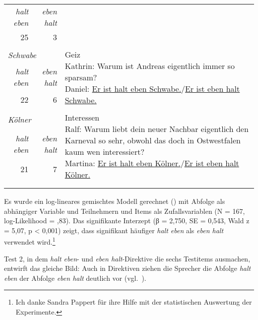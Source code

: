 \begin{table}
\begin{tabularx}{\textwidth}{rrX}
\cmidrule(lr){1-2}
\emph{halt eben}& \emph{eben halt} & {}\\
\cmidrule(lr){1-2}
25 & 3 & {}\\
 & & {}\\
\midrule
\multicolumn{2}{l}{{\textit{Schwabe}}}& \multirow{3}{\hsize}{{Geiz
}\newline Kathrin: Warum ist Andreas eigentlich immer so sparsam? \newline
Daniel: \ul{Er ist halt eben Schwabe.}/\ul{Er ist eben halt Schwabe.}}\\
\cmidrule(lr){1-2}
\emph{halt eben}& \emph{eben halt} & {}\\
\cmidrule(lr){1-2}
22 & 6 & {}\\
 & & {}\\
\midrule
\multicolumn{2}{l}{{\textit{Kölner}}}& \multirow{4}{\hsize}{{Interessen
}\newline Ralf: Warum liebt dein neuer Nachbar eigentlich den Karneval so 
sehr, obwohl das doch in Ostwestfalen kaum wen interessiert? \newline	
Martina: \ul{Er ist halt eben Kölner.}/\ul{Er ist eben halt Kölner.}}\\
\cmidrule(lr){1-2}
\emph{halt eben}& \emph{eben halt} & {}\\
\cmidrule(lr){1-2}
21 & 7 & {}\\
& & \\
 & & {}\\
\lspbottomrule
\end{tabularx}
\end{table}
Es wurde ein log-lineares gemischtes Modell gerechnet (\citealt{Baayen2008}) mit Abfolge als abhängiger Variable und Teilnehmern und Items als Zufallsvariablen (N = 167, log-Like\-li\-hood = ,83). Das signifikante Interzept (β = 2,750, SE = 0,543, Wald z = 5,07, p < 0,001) zeigt, dass signifikant häufiger \textit{halt eben} als \textit{eben halt} verwendet wird.\footnote{Ich danke Sandra Pappert für ihre Hilfe mit der statistischen Auswertung der Experimente.}

Test 2, in dem \textit{halt eben}- und \textit{eben halt}-Direktive  die sechs Testitems ausmachen, entwirft das gleiche Bild: Auch in Direktiven ziehen die Sprecher die Abfolge \textit{halt eben} der Abfolge \textit{eben halt} deutlich vor (vgl.\ ).

